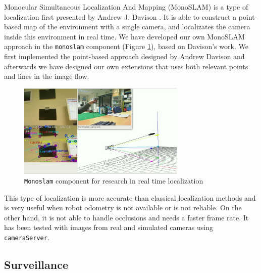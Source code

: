 \documentclass[twocolumn]{svjour3}          %
\begin{document}
Monocular Simultaneous Localization And Mapping (MonoSLAM) is a type of localization first presented by Andrew J. Davison \cite{davison2007}. It is able to construct a point-based map of the environment with a single camera, and localizates the camera inside this environment in real time. We have developed our own MonoSLAM approach in the \texttt{monoslam} component (Figure \ref{fig:monoslam}), based on Davison's work. We first implemented the point-based approach designed by Andrew Davison and afterwards we have designed our own extensions that uses both relevant points and lines in the image flow.

\begin{figure}
\begin{center}
\includegraphics[width=8cm]{figs/monoslam.png}
\caption{\texttt{Monoslam} component for research in real time localization}
\end{center}
\label{fig:monoslam}
\end{figure}

This type of localization is more accurate than classical localization methods and is very useful when robot odometry is not available or is not reliable. On the other hand, it is not able to handle occlusions and needs a faster frame rate. It has been tested with images from real and simulated cameras using \texttt{cameraServer}.

\subsection{Surveillance}
\end{document}
